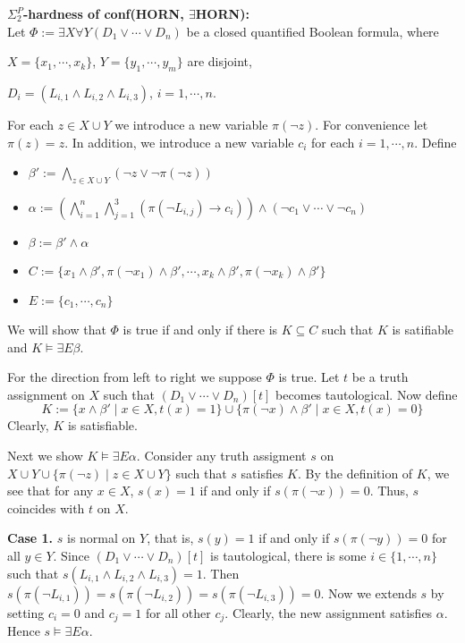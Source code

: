 \documentclass[12pt]{article}
\begin{document}
{\bf $\Sigma^P_2$-hardness of conf(HORN, $\exists$HORN):}\\

Let $\Phi:=\exists X\forall Y (D_1\vee\cdots\vee D_n)$ be a closed quantified Boolean formula, where 

$X=\{x_1,\cdots, x_k\}$, $Y=\{y_1,\cdots, y_m\}$ are disjoint, 

$D_i=(L_{i,1}\wedge L_{i,2}\wedge L_{i,3})$, $i=1,\cdots, n$.

\noindent For each $z\in X\cup Y$ we introduce a new variable $\pi(\neg z)$. For convenience let $\pi(z)=z$. In addition, we introduce a new variable $c_i$ for each $i=1,\cdots, n$. Define

\begin{itemize}
\item $\beta':=\bigwedge_{z\in X\cup Y} (\neg z\vee \neg \pi(\neg z))$

\item $\alpha:=\left(\bigwedge_{i=1}^{n}\bigwedge_{j=1}^{3}(\pi(\neg L_{i,j})\rightarrow c_i)\right)\wedge(\neg c_1\vee\cdots\vee \neg c_n)$

\item $\beta:=\beta'\wedge\alpha$

\item $C:=\{x_1\wedge \beta', \pi(\neg x_1)\wedge\beta', \cdots, 
x_k\wedge \beta', \pi(\neg x_k)\wedge\beta'\}$

\item $E:=\{c_1,\cdots, c_n\}$
\end{itemize}
We will show that $\Phi$ is true if and only if there is $K\subseteq C$ such that $K$ is satifiable and $K\models\exists E\beta$.

For the direction from left to right we suppose $\Phi$ is true. Let $t$ be a truth assignment on $X$ such that $(D_1\vee\cdots\vee D_n)[t]$ becomes tautological. Now define
$$K:=\{x\wedge \beta'\mid x\in X, t(x)=1\}\cup\{\pi(\neg x)\wedge\beta'\mid x\in X, t(x)=0\}$$
Clearly, $K$ is satisfiable. 

Next we show $K\models \exists E \alpha$. Consider any truth assigment $s$ on $X\cup Y\cup \{\pi(\neg z)\mid z\in X\cup Y\}$ such that $s$ satisfies $K$. By the definition of $K$, we see that for any $x\in X$, $s(x)=1$ if and only if $s(\pi(\neg x))=0$. Thus, $s$ coincides with $t$ on $X$.

{\bf Case 1.}  $s$ is normal on $Y$, that is, $s(y)=1$ if and only if $s(\pi(\neg y))=0$ for all $y\in Y$. 
Since $(D_1\vee\cdots\vee D_n)[t]$ is tautological, there is  some $i\in\{1,\cdots, n\}$ such that $s(L_{i,1}\wedge L_{i,2}\wedge L_{i,3})=1$. Then $s(\pi(\neg L_{i,1}))=s(\pi(\neg L_{i,2}))=s(\pi(\neg L_{i,3}))=0$. Now we extends $s$ by setting $c_i=0$ and $c_j=1$ for all other $c_j$. Clearly, the new assignment satisfies $\alpha$. Hence $s\models \exists E\alpha$.  
\end{document}
